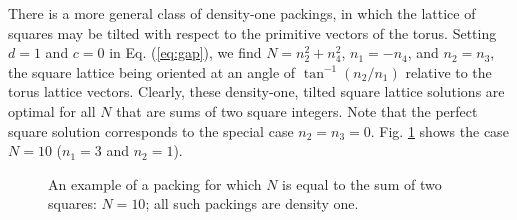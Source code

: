 \documentclass[aps]{revtex4}
\begin{document}
There is a more general class of density-one packings, in which the lattice of squares may be tilted with respect to the primitive vectors of the torus. Setting $d=1$ and $c=0$ in Eq. (\ref{eq:gap}), we find $N=n_2^2 + n_4^2$, $n_1=-n_4$, and $n_2 = n_3$, the square lattice being oriented at an angle of $\tan^{-1}(n_2/n_1)$ relative to the torus lattice vectors.   Clearly, these density-one, tilted square lattice solutions are optimal for all $N$ that are sums of two square integers.  Note that the perfect square solution corresponds to the special case $n_2 = n_3 = 0$.  Fig. \ref{fig:bravais} shows the case $N=10$ ($n_1=3$ and $n_2=1$).

\begin{figure}[H]
\caption{\label{fig:bravais} An example of a packing for which $N$ is equal to the sum of two squares: $N=10$; all such packings are density one.}
\end{figure}
\end{document}
